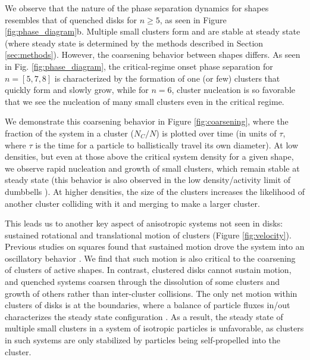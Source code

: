 We observe that the nature of the phase separation dynamics for shapes resembles that of quenched disks\cite{Redner_2013_PRL} for $n{\geq}5$, as seen in Figure \ref{fig:phase_diagram}b.
Multiple small clusters form and are stable at steady state (where steady state is determined by the methods described in Section \ref{sec:methods}).
However, the coarsening behavior between shapes differs.
As seen in Fig. \ref{fig:phase_diagram}, the critical-regime onset phase separation for $n=[5,7,8]$ is characterized by the formation of one (or few) clusters that quickly form and slowly grow, while for $n=6$, cluster nucleation is so favorable that we see the nucleation of many small clusters even in the critical regime.

We demonstrate this coarsening behavior in Figure \ref{fig:coarsening}, where the fraction of the system in a cluster ($N_C/N$) is plotted over time (in units of $\tau$, where $\tau$ is the time for a particle to ballistically travel its own diameter).
At low densities, but even at those above the critical system density for a given shape, we observe rapid nucleation and growth of small clusters, which remain stable at steady state (this behavior is also observed in the low density/activity limit of dumbbells \cite{Suma_2014_EPL}).
At higher densities, the size of the clusters increases the likelihood of another cluster colliding with it and merging to make a larger cluster.

This leads us to another key aspect of anisotropic systems not seen in disks: sustained rotational and translational motion of clusters (Figure \ref{fig:velocity}).
Previous studies on squares found that sustained motion drove the system into an oscillatory behavior \cite{Prymidis_2016_SoftMatter}.
We find that such motion is also critical to the coarsening of clusters of active shapes.
In contrast, clustered disks cannot sustain motion, and quenched systems coarsen through the dissolution of some clusters and growth of others rather than inter-cluster collisions.
The only net motion within clusters of disks is at the boundaries, where a balance of particle fluxes in/out characterizes the steady state configuration \cite{Redner_2013_PRL}.
As a result, the steady state of multiple small clusters in a system of isotropic particles is unfavorable, as clusters in such systems are only stabilized by particles being self-propelled into the cluster.



